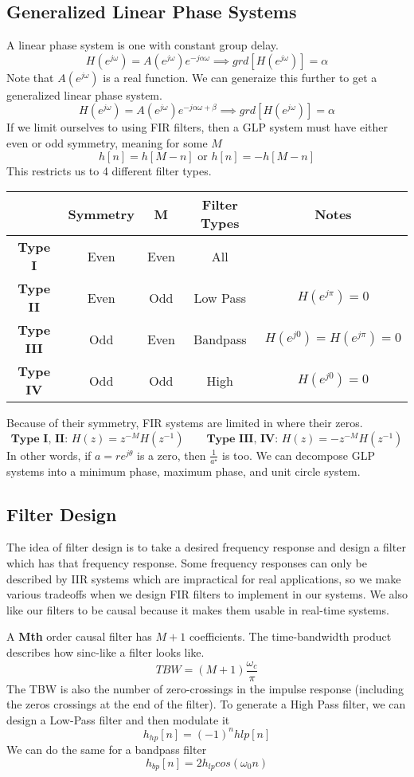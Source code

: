 \documentclass{article}
\begin{document}
\subsection{Generalized Linear Phase Systems}
A linear phase system is one with constant group delay.
$$H(e^{j\omega}) = A(e^{j\omega})e^{-j\alpha\omega} \implies grd[H(e^{j\omega})] = \alpha$$
Note that $A(e^{j\omega})$ is a real function. We can generaize this further to get a generalized linear phase system.
$$H(e^{j\omega}) = A(e^{j\omega})e^{-j\alpha\omega + \beta} \implies grd[H(e^{j\omega})] = \alpha$$
If we limit ourselves to using FIR filters, then a GLP system must have either even or odd symmetry, meaning for some $M$
$$h[n]=h[M-n] \text{ or } h[n] = -h[M-n]$$
This restricts us to 4 different filter types.
\begin{center}
  \begin{tabular}{|c|c|c|c|c|}
    \hline 
    & \textbf{Symmetry} & \textbf{M} & \textbf{Filter Types} & \textbf{Notes}\\
     \hline
     \textbf{Type I} & Even & Even & All & \\
     \hline
     \textbf{Type II} & Even & Odd & Low Pass & $H(e^{j\pi})=0$\\
     \hline
     \textbf{Type III} & Odd & Even & Bandpass & $H(e^{j0})=H(e^{j\pi})=0$\\
     \hline
     \textbf{Type IV} & Odd & Odd & High & $H(e^{j0})=0$\\
     \hline
  \end{tabular}
\end{center}
Because of their symmetry, FIR systems are limited in where their zeros.
$$\textbf{Type I, II: }H(z) = z^{-M}H(z^{-1}) \qquad \textbf{Type III, IV: } H(z) = -z^{-M}H(z^{-1})$$
In other words, if $a = re^{j\theta}$ is a zero, then $\frac{1}{a^\star}$ is too.
We can decompose GLP systems into a minimum phase, maximum phase, and unit circle system.
\subsection{Filter Design}
The idea of filter design is to take a desired frequency response and design a filter which has that frequency response.
Some frequency responses can only be described by IIR systems which are impractical for real applications, so we make various tradeoffs
when we design FIR filters to implement in our systems. We also like our filters to be causal because it makes them usable in real-time systems.

A \textbf{Mth} order causal filter has $M+1$ coefficients. The time-bandwidth product describes how sinc-like a filter looks like.
$$TBW = (M+1)\frac{\omega_c}{\pi}$$
The TBW is also the number of zero-crossings in the impulse response (including the zeros crossings at the end of the filter).
To generate a High Pass filter, we can design a Low-Pass filter and then modulate it
$$h_{hp}[n] = (-1)^nh{lp}[n]$$
We can do the same for a bandpass filter
$$h_{bp}[n] = 2h_{lp}cos(\omega_0 n)$$
\end{document}

